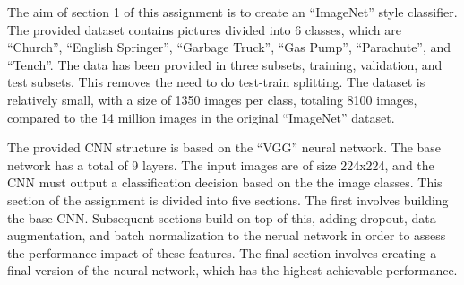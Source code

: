 The aim of section 1 of this assignment is to create an ``ImageNet'' style
classifier. The provided dataset contains pictures divided into 6 classes,
which are ``Church'', ``English Springer'', ``Garbage Truck'', ``Gas Pump'',
``Parachute'', and ``Tench''. The data has been provided in three subsets,
training, validation, and test subsets. This removes the need to do test-train
splitting. The dataset is relatively small, with a size of 1350 images
per class, totaling 8100 images,
compared to the 14 million images in the original ``ImageNet'' dataset.

The provided CNN structure is based on the ``VGG'' neural network. The base
network has a total of 9 layers. The input images are of size 224x224, and the
CNN must output a classification decision based on the the image classes. This
section of the assignment is divided into five sections. The first involves
building the base CNN. Subsequent sections build on top of this, adding dropout,
data augmentation, and batch normalization to the nerual network in order to
assess the performance impact of these features. The final section involves
creating a final version of the neural network, which has the highest achievable
performance.
